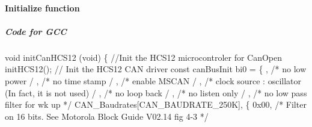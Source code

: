 \documentclass[a4paper,12pt]{book}
\begin{document}
\paragraph{Initialize function}
\subparagraph{Code for GCC}
{\ttfamily
void initCanHCS12 (void)\newline
 \{ \space \newline
  \space //Init the HCS12 microcontroler for CanOpen \newline
  \space initHCS12();\newline
  \space \space // Init the HCS12 \space CAN driver\newline
  \space const canBusInit bi0 = \{\newline
  \space \space {}, \space \space \space /* no low power \space \space \space \space \space \space \space \space \space \space \space \space \space \space \space \space */
\newline
  \space \space {}, \space \space \space /* no time stamp
\space \space \space \space \space \space \space \space \space \space \space \space \space \space \space */\newline
  \space \space {}, \space \space \space /* enable MSCAN
\space \space \space \space \space \space \space \space \space \space \space \space \space \space \space \space */\newline
  \space \space {}, \space \space \space /* clock source : oscillator (In fact, it is not used)
\space \space */\newline
  \space \space {}, \space \space \space /* no loop back
\space \space \space \space \space \space \space \space \space \space \space \space \space \space \space \space */\newline
  \space \space {}, \space \space \space /* no listen only
\space \space \space \space \space \space \space \space \space \space \space \space \space \space */\newline
  \space \space {}, \space \space \space /* no low pass filter for wk up */\newline
  \space CAN\_Baudrates[CAN\_BAUDRATE\_250K],\newline
  \space \space \space \{\newline
  \space \space \space \space \space 0x00, \space \space \space /* Filter on 16 bits.\newline
  \space \space \space \space \space \space \space \space \space \space \space \space \space \space \space \space \space See Motorola Block Guide V02.14 fig
4{}-3 */\newline
}
\end{document}
